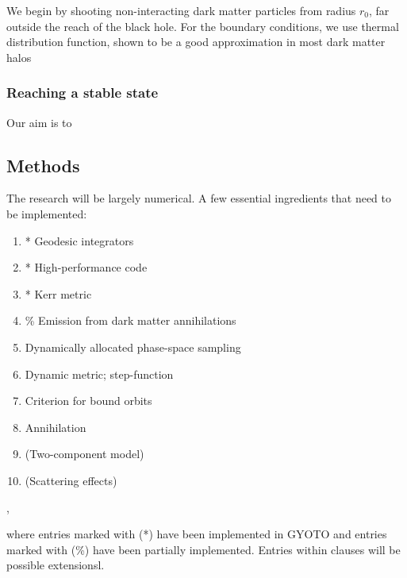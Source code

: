 \documentclass[12pt]{article}
\begin{document}

We begin by shooting non-interacting dark matter particles from radius $r_0$, far outside the reach of the black hole. 
For the boundary conditions, we use thermal distribution function, shown to be a good approximation in most 
dark matter halos


\subsubsection{Reaching a stable state}


Our aim is to 


\subsection{Methods}



The research will be largely numerical. A few essential ingredients that need to be implemented:

\begin{enumerate}
 \item * Geodesic integrators
 \item * High-performance code %
 \item * Kerr metric
 \item \% Emission from dark matter annihilations
 \item Dynamically allocated phase-space sampling
 \item Dynamic metric; step-function
 \item Criterion for bound orbits
 \item Annihilation
 \item (Two-component model)
 \item (Scattering effects)
\end{enumerate},

where entries marked with (*) have been implemented in GYOTO \citep{gyoto_vincent_2011} and entries marked with (\%) have been partially implemented. 
Entries within clauses will be possible extensionsl.
\end{document}

